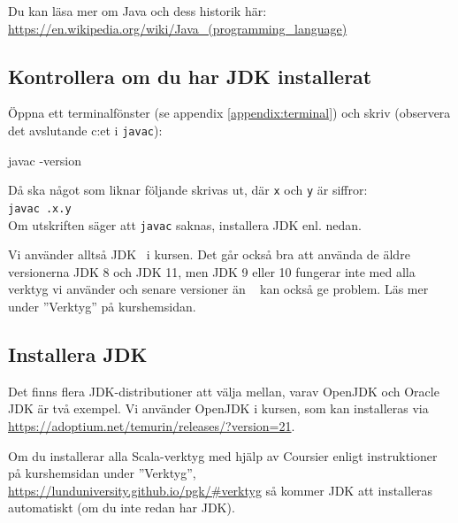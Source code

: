 \noindent Du kan läsa mer om Java och dess historik här: \\
\href{https://en.wikipedia.org/wiki/Java_(programming_language)}{https://en.wikipedia.org/wiki/Java\_(programming\_language)}

\subsection{Kontrollera om du har JDK installerat}\label{appendix:compile:check-jdk}

Öppna ett terminalfönster (se appendix \ref{appendix:terminal}) och skriv (observera det avslutande c:et i \texttt{javac}):
\begin{REPLnonum}
javac -version
\end{REPLnonum}
Då ska något som liknar följande skrivas ut, där \texttt{x} och \texttt{y} är siffror:\\
\texttt{javac \JDKVersion.x.y}\\
Om utskriften säger att \texttt{javac} saknas, installera JDK enl. nedan.

Vi använder alltså JDK \JDKVersion~i kursen. Det går också bra att använda de äldre versionerna JDK 8 och JDK 11, men JDK 9 eller 10 fungerar inte med alla verktyg vi använder och senare versioner än \JDKVersion~ kan också ge problem. Läs mer under ''Verktyg'' på kurshemsidan.






\subsection{Installera JDK}\label{appendix:compile:install-jdk}

Det finns flera JDK-distributioner att välja mellan, varav OpenJDK och Oracle JDK är två exempel. Vi använder OpenJDK i kursen, som kan installeras via \\ \url{https://adoptium.net/temurin/releases/?version=21}. 

Om du installerar alla Scala-verktyg med hjälp av Coursier enligt instruktioner på kurshemsidan under ''Verktyg'', \url{https://lunduniversity.github.io/pgk/#verktyg} så kommer JDK att installeras automatiskt (om du inte redan har JDK). %

